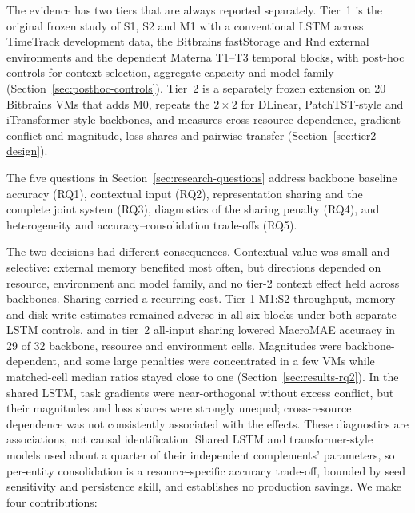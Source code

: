 \documentclass[5p,twocolumn]{elsarticle}
\begin{document}
The evidence has two tiers that are always reported separately. Tier~1 is
the original frozen study of S1, S2 and M1 with a conventional LSTM across
TimeTrack development data, the Bitbrains fastStorage and Rnd external
environments and the dependent Materna T1--T3 temporal blocks, with
post-hoc controls for context selection, aggregate capacity and model family
(Section~\ref{sec:posthoc-controls}). Tier~2 is a separately frozen
extension on 20 Bitbrains VMs that adds M0, repeats the $2\times2$ for
DLinear, PatchTST-style and iTransformer-style backbones, and measures
cross-resource dependence, gradient conflict and magnitude, loss shares and
pairwise transfer (Section~\ref{sec:tier2-design}).

The five questions in Section~\ref{sec:research-questions} address backbone
baseline accuracy (RQ1), contextual input (RQ2), representation sharing and
the complete joint system (RQ3), diagnostics of the sharing penalty (RQ4), and
heterogeneity and accuracy--consolidation trade-offs (RQ5).

The two decisions had different consequences. Contextual value was small
and selective: external memory benefited most often, but directions depended
on resource, environment and model family, and no tier-2 context effect held
across backbones. Sharing carried a recurring cost. Tier-1 M1:S2 throughput,
memory and disk-write estimates remained adverse in all six blocks under both
separate LSTM controls, and in tier~2 all-input sharing lowered MacroMAE
accuracy in 29 of 32 backbone, resource and environment cells. Magnitudes
were backbone-dependent, and some large penalties were concentrated in a few
VMs while matched-cell median ratios stayed close to one
(Section~\ref{sec:results-rq2}). In the shared LSTM, task gradients were
near-orthogonal without excess conflict, but their magnitudes and loss
shares were strongly unequal; cross-resource dependence was not
consistently associated with the effects. These diagnostics are associations, not causal identification.
Shared LSTM and transformer-style models used about a quarter of their
independent complements' parameters, so per-entity consolidation is a
resource-specific accuracy trade-off, bounded by seed sensitivity and
persistence skill, and establishes no production savings. We make four
contributions:
\end{document}
